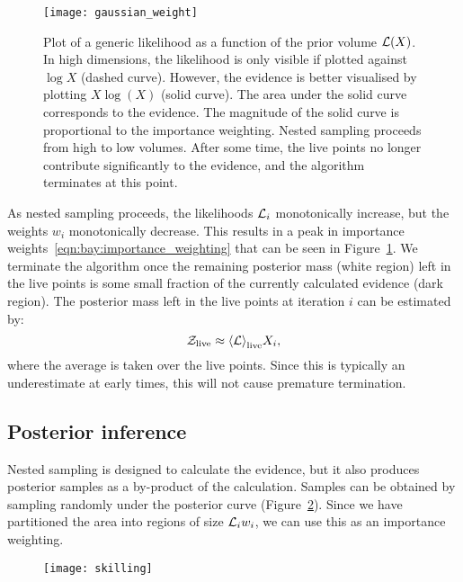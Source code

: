 %
\begin{figure}
  \centering
  \texttt{[image: gaussian\_weight]}
  \caption{%
    Plot of a generic likelihood as a function of the prior volume $\mathcal{L}(X)$. In high dimensions, the likelihood is only visible if plotted against $\log X$ (dashed curve). However, the evidence is better visualised by plotting $X\log(X)$ (solid curve). The area under the solid curve corresponds to the evidence. The magnitude of the solid curve is proportional to the importance weighting. Nested sampling proceeds from high to low volumes. After some time, the live points no longer contribute significantly to the evidence, and the algorithm terminates at this point.\label{fig:bay:gaussian_weight}
  }
\end{figure}
%
As nested sampling proceeds, the likelihoods $\mathcal{L}_i$ monotonically increase, but the weights $w_i$ monotonically decrease. This results in a peak in importance weights~\eqref{eqn:bay:importance_weighting} that can be seen in Figure~\ref{fig:bay:gaussian_weight}. We terminate the algorithm once the remaining posterior mass (white region) left in the live points is some small fraction of the currently calculated evidence (dark region). The posterior mass left in the live points at iteration $i$ can be estimated by:
\begin{equation}
  \mathcal{Z}_{\mathrm{live}} \approx {\left\langle{\mathcal{L}}\right\rangle}_{\mathrm{live}} X_i,
  \label{eqn:bay:live_evidence}
\end{equation}
where the average is taken over the live points. Since this is typically an underestimate at early times, this will not cause premature termination.




\subsection{Posterior inference}
Nested sampling is designed to calculate the evidence, but it also produces posterior samples as a by-product of the calculation. Samples can be obtained by sampling randomly under the posterior curve (Figure~\ref{fig:bay:posterior}). Since we have partitioned the area into regions of size $\mathcal{L}_i w_i$, we can use this as an importance weighting.

\begin{figure}
  \centering
  \texttt{[image: skilling]}
  \caption{%
  \label{fig:bay:posterior}
}
\end{figure}

